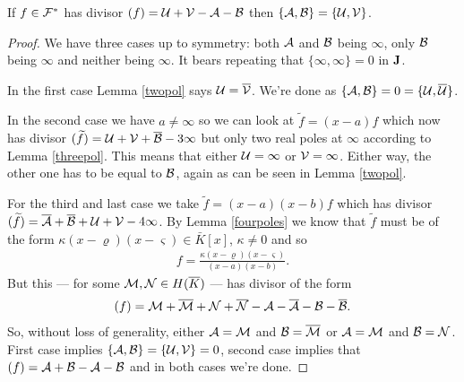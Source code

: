 \documentclass[english,11pt,a4paper]{article}
\begin{document}
\begin{lemma}\label{easypeasy}
  If $f \in \mathcal{F}^*$ has divisor $(f) = \mathcal{U} + \mathcal{V} -\mathcal{A} -\mathcal{B}$ then $\{ \mathcal{A}, \mathcal{B} \} = \{\mathcal{U}, \mathcal{V} \}$.
  \begin{proof}
    We have three cases up to symmetry: both $\mathcal{A}$ and $\mathcal{B}$ being $\infty$, only $\mathcal{B}$ being $\infty$ and neither being $\infty$. It bears repeating that $\{ \infty, \infty\} = 0$ in $\mathbf{J}$.

    In the first case Lemma \ref{twopol} says $\mathcal{U} = \overline {\mathcal{V}}$. We're done as $\{ \mathcal{A}, \mathcal{B} \} = 0 = \{\mathcal{U}, \overline {\mathcal{U}} \}$.

    In the second case we have $a \neq \infty$ so we can look at $\tilde f = (x - a) f$ which now has divisor $(\widetilde f) = \mathcal{U} + \mathcal{V} + \overline {\mathcal{B}} - 3 \infty$ but only two real poles at $\infty$ according to Lemma \ref{threepol}. This means that either $\mathcal{U} = \infty$ or $\mathcal{V} = \infty$. Either way, the other one has to be equal to $\mathcal{B}$, again as can be seen in Lemma \ref{twopol}.

    For the third and last case we take $\tilde f = (x-a)(x-b)f$ which has divisor $(\widetilde f) = \overline {\mathcal{A}} + \overline {\mathcal{B}}+ \mathcal{U} + \mathcal{V} - 4 \infty$. By Lemma \ref{fourpoles} we know that $\tilde f$ must be of the form $\kappa (x-\varrho)(x-\varsigma) \in \bar K [x]$, $\kappa \neq 0$ and so
\begin{align*}
  f=\frac{\kappa (x-\varrho)(x-\varsigma)}{(x-a)(x-b)}.
\end{align*}
But this --- for some $\mathcal{M} , \mathcal{N} \in H(\overline K)$ --- has divisor of the form
\begin{align*}
  (f) = \mathcal{M} + \overline {\mathcal{M}} + \mathcal{N} + \overline {\mathcal{N}} - \mathcal{A} - \overline {\mathcal{A}} - \mathcal{B} - \overline {\mathcal{B}}.
\end{align*}
So, without loss of generality, either $\mathcal{A} = \mathcal{M}$ and $\mathcal{B} = \overline {\mathcal{M}}$ or $\mathcal{A} = \mathcal{M}$ and $\mathcal{B} = \mathcal{N}$. First case implies $\{ \mathcal{A}, \mathcal{B} \} = \{\mathcal{U}, \mathcal{V} \} = 0$, second case implies that $(f)= \mathcal{A} + \mathcal{B} - \mathcal{A} - \mathcal{B}$ and in both cases we're done.
  \end{proof}
\end{lemma}
\end{document}
